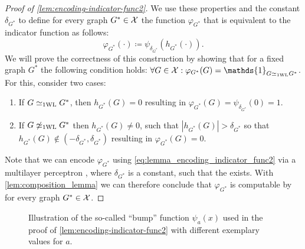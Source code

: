 \begin{proof}[Proof of \cref{lem:encoding-indicator-func2}]
    We use these properties and the constant $\delta_{G^*}$ to define for every graph ${G^*} \in \mathcal{X}$ the function $\varphi_{G^*}$ that is equivalent to the indicator function as follows:
    \begin{equation*}
        \varphi_{G^*}(\cdot) \coloneqq \psi_{\delta_{G^*}} (h_{G^*}(\cdot)).
    \end{equation*}
    We will prove the correctness of this construction by showing that for a fixed graph $G^*$ the following condition holds: $\forall G 
    \in \cX: \varphi_{G^*}(G) = \mathds{1}_{G \wliso G^*}$. For this, consider two cases:
    \begin{enumerate}
        \item If $G \simeq_{\text{1WL}} G^*$, then $h_{G^*}(G) = 0$ resulting in $\varphi_{G^*}(G) = \psi_{\delta_{G^*}}(0) = 1$.
        \item If $G \not\simeq_{\text{1WL}} G^*$ then $h_{G^*}(G) \neq 0$, such that $|h_{G^*}(G)|> \delta_{G^*}$ so that $h_{G^*}(G) \not\in (-\delta_{G^*}, \delta_{G^*}) $ resulting in $\varphi_{G^*}(G) = 0$.
    \end{enumerate}
    Note that we can encode $\varphi_{G^*}$ using \cref{eq:lemma_encoding_indicator_func2} via a multilayer perceptron \mlp, where $\delta_{G^*}$ is a constant, such that the \mlp exists. With \cref{lem:composition_lemma} we can therefore conclude that $\varphi_{G^*}$ is computable by \wlnn for every graph ${G^*} \in \mathcal{X}$.
\end{proof}

\begin{figure}[!htb]
    \centering
    
    \caption{Illustration of the so-called ``bump'' function $\psi_a(x)$ used in the proof of \cref{lem:encoding-indicator-func2} with different exemplary values for $a$.}
    \label{fig:bump_function}
\end{figure}

